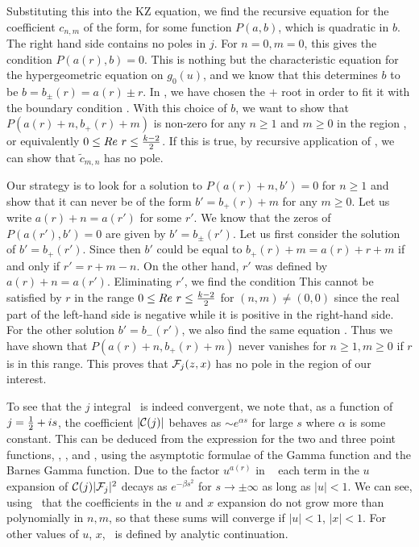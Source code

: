 Substituting this into the KZ equation, we find the recursive equation
for the coefficient $c_{n,m}$ of the form,
\eqn{}
for some function $P(a,b)$, which is quadratic in $b$.
The right hand side contains no
poles in $j$. For $n=0, m=0$, this
gives the condition $P(a(r), b)=0$. This is nothing but the characteristic
equation for the hypergeometric equation on $g_0(u)$, and
we know that this determines $b$ to be $b=b_\pm(r) = a(r)
\pm r$. In \gzero, we have chosen the $+$ root in order
to fit it with the boundary condition \smallz. With this
choice of $b$, we want to show that $P(a(r)+n, b_+(r) + m)$
is non-zero for any $n\geq 1$ and $m \geq 0$
in the region  , or equivalently
$0 \leq Re~r \leq {k-2\over 2}$. If this is true,
by recursive application of \recurse , we can show that
$\tilde{c}_{m,n}$ has no pole.

Our strategy is to look for a solution to $P(a(r)+n, b')=0$
for $n\geq 1$
and show that it can never be of the form $b'=b_+(r) + m$
for any $m \geq 0$. Let us write $a(r) + n = a(r')$ for
some $r'$. We know that the zeros of $P(a(r'),b')=0$
are given by $b'= b_\pm(r')$. Let us first consider the solution
of $b'=b_+(r')$. Since
\eqn{}
then $b'$ could be  equal to $b_+(r) + m=a(r) + r + m$
if and only if $r' = r + m-n$. On the other hand,
$r'$ was defined by
$a(r)+n = a(r')$. Eliminating $r'$, we find the
condition
\eqn{}
This cannot be satisfied by $r$ in the range
$0 \leq  Re~r \leq {k-2\over 2}$ for $(n,m) \not = (0,0)$
since the real part of the left-hand side is negative
while it is positive in the right-hand side.
For the other solution $b'=b_-(r')$, we also
find the same equation \notpossible.
Thus we have shown that $P(a(r)+n, b_+(r)+m)$
never vanishes for $n \geq 1, m \geq 0$ if $r$ is
in this range. This proves
that ${\cal F}_j(z,x)$ has no pole in the region of
our interest.




To see that the $j$ integral \expres\ is indeed convergent, we note
that, as a function of $j={1\over 2} + is$,
the coefficient $|{\cal C}(j)|$
behaves as $\sim e^{\alpha s}$ for large $s$ where $\alpha$ is
some constant. This can be deduced from the expression for the
two and three point functions,  , \threecoeff ,
and \whatg , using the asymptotic formulae of the Gamma function
and the Barnes Gamma function.
Due to the factor
$u^{a(r)}$ in \expansionwithb\
each term in the $u$ expansion of ${\cal C}(j)|{\cal F}_j|^2$
decays as $e^{-\beta s^2}$ for
$s \rightarrow \pm \infty$ as long as $|u| < 1$.
We can see, using \recurse\ that the coefficients in the
$u$ and $x$ expansion do not grow more than polynomially in $n,m$,
so that these sums will converge if $|u|<1$, $|x|<1$.
For other values of $u$, $x$,
 \expres\ is defined by analytic continuation.




